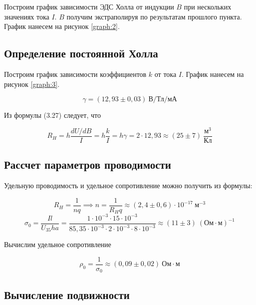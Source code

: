 \documentclass[a4paper,12pt]{article}
\begin{document}
Построим график зависимости ЭДС Холла от индукции $B$ при нескольких значениях тока $I$. $B$ получим экстраполируя по результатам прошлого пункта. График нанесем на рисунок \ref{graph:2}.

\subsection{Определение постоянной Холла}

Построим график зависимости коэффициентов $k$ от тока $I$. График нанесем на рисунок \ref{graph:3}.

\begin{equation}\label{eq:mnk}
    \gamma = (12,93 \pm 0,03) \ \text{В}/\text{Тл} / \text{мА}
\end{equation}

Из формулы (3.27) следует, что

\begin{equation*}
    R_H = h \frac{dU / dB}{I} = h \frac{k}{I} = h \gamma = 2 \cdot 12,93 \approx (25 \pm 7) \ \frac{\text{м}^3}{\text{Кл}}
\end{equation*}

\subsection{Рассчет параметров проводимости}

Удельную проводимость и удельное сопротивление можно получить из формулы:

\begin{equation*}
    R_H = \frac{1}{nq} \implies n = \frac{1}{R_H q} \approx (2,4 \pm 0,6) \cdot 10^{-17} \ \text{м}^{-3}
\end{equation*}
\begin{equation*}
    \sigma_0 = \frac{I l}{U_{35} ha} = \frac{1 \cdot 10^{-3} \cdot 15 \cdot 10^{-3}}{85,35 \cdot 10^{-3} \cdot 2 \cdot 10^{-3} \cdot 8 \cdot 10^{-3}} \approx (11 \pm 3) \ \left( \text{Ом} \cdot \text{м} \right)^{-1}
\end{equation*}

Вычислим удельное сопротивление

\begin{equation*}
    \rho_0 = \frac{1}{\sigma_0} \approx (0,09 \pm 0,02) \ \text{Ом} \cdot \text{м}
\end{equation*}

\subsection{Вычисление подвижности}
\end{document}
